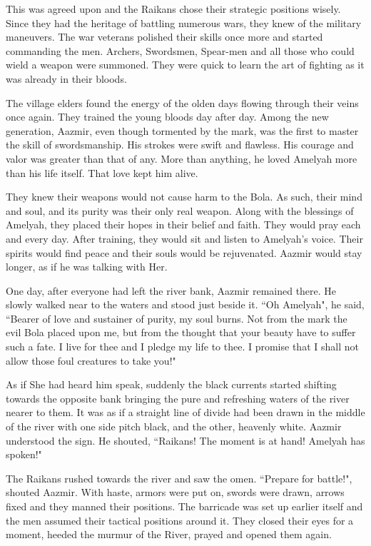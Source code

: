 \documentclass[twoside,11pt,titlepage]{article}
\begin{document}
This was agreed upon and the Raikans chose their strategic positions wisely. Since they had the heritage of battling numerous wars, they knew of the military maneuvers. The war veterans polished their skills once more and started commanding the men. Archers, Swordsmen, Spear-men and all those who could wield a weapon were summoned. They were quick to learn the art of fighting as it was already in their bloods.

The village elders found the energy of the olden days flowing through their veins once again. They trained the young bloods day after day. Among the new generation, Aazmir, even though tormented by the mark, was the first to master the skill of swordsmanship. His strokes were swift and flawless. His courage and valor was greater than that of any. More than anything, he loved Amelyah more than his life itself. That love kept him alive.

They knew their weapons would not cause harm to the Bola. As such, their mind and soul, and its purity was their only real weapon. Along with the blessings of Amelyah, they placed their hopes in their belief and faith. They would pray each and every day. After training, they would sit and listen to Amelyah's voice. Their spirits would find peace and their souls would be rejuvenated. Aazmir would stay longer, as if he was talking with Her.

One day, after everyone had left the river bank, Aazmir remained there. He slowly walked near to the waters and stood just beside it. ``Oh Amelyah", he said, ``Bearer of love and sustainer of purity, my soul burns. Not from the mark the evil Bola placed upon me, but from the thought that your beauty have to suffer such a fate. I live for thee and I pledge my life to thee. I promise that I shall not allow those foul creatures to take you!"

As if She had heard him speak, suddenly the black currents started shifting towards the opposite bank bringing the pure and refreshing waters of the river nearer to them. It was as if a straight line of divide had been drawn in the middle of the river with one side pitch black, and the other, heavenly white. Aazmir understood the sign. He shouted, ``Raikans! The moment is at hand! Amelyah has spoken!"

The Raikans rushed towards the river and saw the omen. ``Prepare for battle!", shouted Aazmir. With haste, armors were put on, swords were drawn, arrows fixed and they manned their positions. The barricade was set up earlier itself and the men assumed their tactical positions around it. They closed their eyes for a moment, heeded the murmur of the River, prayed and opened them again.
\end{document}
